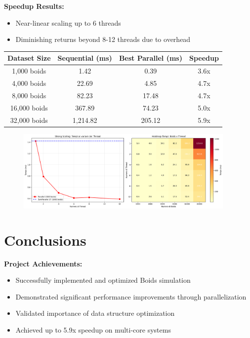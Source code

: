 \newpage
\begin{center}
    \textbf{Speedup Results:}
    \begin{itemize}
        \item Near-linear scaling up to 6 threads
        \item Diminishing returns beyond 8-12 threads due to overhead
    \end{itemize}
    \begin{tabular}{|c|c|c|c|}
    \hline
    \textbf{Dataset Size} & \textbf{Sequential (ms)} & \textbf{Best Parallel (ms)} & \textbf{Speedup} \\
    \hline
    1,000 boids & 1.42 & 0.39 & 3.6x \\
    4,000 boids & 22.69 & 4.85 & 4.7x \\
    8,000 boids & 82.23 & 17.48 & 4.7x \\
    16,000 boids & 367.89 & 74.23 & 5.0x \\
    32,000 boids & 1,214.82 & 205.12 & 5.9x \\
    \hline
    \end{tabular}
\end{center}

\begin{figure}[h]
\centering
\includegraphics[width=0.95\textwidth]{../../images/parallel_analysis_scaling.png}
\end{figure}

\section{Conclusions}

\textbf{Project Achievements:}
\begin{itemize}
    \item Successfully implemented and optimized Boids simulation
    \item Demonstrated significant performance improvements through parallelization
    \item Validated importance of data structure optimization
    \item Achieved up to 5.9x speedup on multi-core systems
\end{itemize}